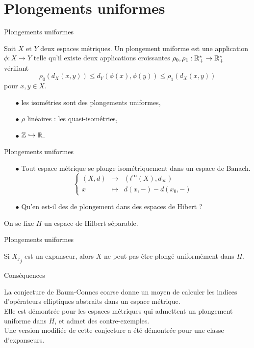\section{Plongements uniformes}
\begin{frame}{Plongements uniformes}

\begin{defn}
Soit $X$ et $Y$ deux espaces métriques. Un plongement uniforme est une application $\phi : X\rightarrow Y$ telle qu'il existe deux applications croissantes $\rho_0,\rho_1 : \mathbb R_+^*\rightarrow \mathbb R_+^*$ vérifiant
\[\rho_0(d_X(x,y))\leq d_Y(\phi(x),\phi(y))\leq \rho_1(d_X(x,y))\] 
pour $x,y\in X$.
\end{defn}

\begin{itemize}
\item[$\bullet$] les isométries sont des plongements uniformes,
\item[$\bullet$] $\rho$ linéaires : les quasi-isométries,
\item[$\bullet$] $\mathbb Z\hookrightarrow \mathbb R$.
\end{itemize}
\end{frame}

\begin{frame}{Plongements uniformes} 
\begin{itemize}
\item[$\bullet$] Tout espace métrique se plonge isométriquement dans un espace de Banach.
\[\left\{\begin{array}{rcl} (X,d) &\rightarrow  & (l^\infty(X),d_\infty) \\ x &\mapsto  & d(x,-)- d(x_0,-)\end{array}\right.\]
\item[$\bullet$] Qu'en est-il des de plongement dans des espaces de Hibert ?
\end{itemize}
On se fixe $H$ un espace de Hilbert séparable.
\end{frame}

\begin{frame}{Plongements uniformes} 
\begin{thm}
Si ${X_j}_j$ est un expanseur, alors $X$ ne peut pas être plongé uniformément dans $H$.
\end{thm}
\end{frame}

\begin{frame}{Conséquences} 

La conjecture de Baum-Connes coarse donne un moyen de calculer les indices d'opérateurs elliptiques abstraits dans un espace métrique.\\
Elle est démontrée pour les espaces métriques qui admettent un plongement uniforme dans $H$, et admet des contre-exemples.\\
Une version modifiée de cette conjecture a été démontrée pour une classe d'expanseurs. \\
\end{frame}
